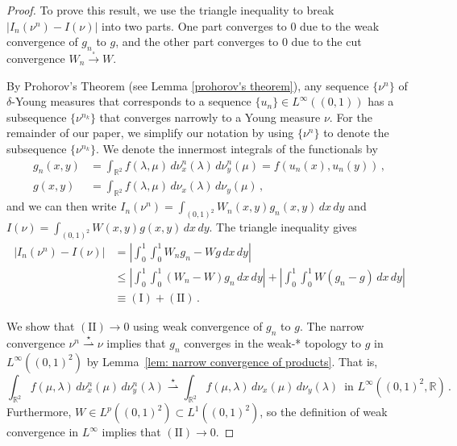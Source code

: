 \documentclass[11pt]{amsart}
\def\R{\mathbb{R}}
\def\ra{\rightarrow}
\def\sqra{\stackrel{\square}{\longrightarrow}}
\def\weakstarra{\stackrel{\star}{\rightharpoonup}}
\numberwithin{equation}{section}
\begin{document}
{{\begin{proof}
To prove this result, we use the triangle inequality to break $|I_n(\nu^n) - I(\nu)|$ into two parts. {One part} converges to $0$ due to {the} weak convergence of $g_n$ to $g$, and the other part converges to $0$ due to the cut convergence $W_n \sqra W$.

By {Prohorov's Theorem ({see} Lemma \ref{prohorov's theorem})}, any sequence $\{\nu^n\}$ of $\delta$-Young measures that corresponds to a sequence $\{u_n\} \in L^\infty((0,1))$ has a subsequence $\{\nu^{n_k}\}$ that converges narrowly to a Young measure $\nu$. For the remainder of our paper, we simplify our notation by using $\{\nu^n\}$ to denote the subsequence $\{\nu^{n_k}\}$.
We denote the innermost integrals of the functionals by 
\begin{align*}
    g_n(x,y) &= \int_{\R^2} f(\lambda,\mu) \,d\nu^n_x (\lambda) \,d\nu^n_y(\mu) = f(u_n(x),u_n(y)) \,, \\
    g(x,y) &= \int_{\R^2} f(\lambda,\mu) \,d\nu_x (\lambda) \,d\nu_y(\mu) \,,
\end{align*}
and we can then write $I_n(\nu^n) = \int_{(0,1)^2}W_n(x,y) g_n(x,y) \,dx \, dy$ and $I(\nu) = \int_{(0,1)^2} W(x,y) g(x,y) \, dx \, dy$. 
The triangle inequality gives
\begin{align*}
    |I_n(\nu^n) - I(\nu)| &= \left|\int_0^1\int_0^1 W_ng_n - Wg \,dx\,dy\right| \\
	    &\leq \left| \int_0^1\int_0^1 (W_n - W)g_n \,dx\,dy\right| + \left| \int_0^1\int_0^1 W(g_n - g)  \,dx\,dy\right| \\
	    &\equiv ({\mathrm{I}}) + ({\mathrm{II}}) \,. 
\end{align*}	



We show that {${(\mathrm{II})} \ra 0$} using weak convergence of $g_n$ to $g$. The narrow convergence $\nu^n \weakstarra \nu$ implies that {$g_n$ converges in the weak-* topology to $g$} in $L^{\infty}((0,1)^2)$ by {Lemma}~\ref{lem: narrow convergence of products}. That is,
\begin{equation*}
    \int_{\mathbb{R}^2} f(\mu,\lambda) \, d \nu_x^n(\mu) \, d \nu_y^n(\lambda) \weakstarra \int_{\mathbb{R}^2} f(\mu,\lambda) \, d \nu_x(\mu) \, d \nu_y(\lambda) \, \text{ in }  L^{\infty}((0,1)^2,\mathbb{R})\,. 
\end{equation*} 
Furthermore, $W \in L^p((0,1)^2) \subset L^1((0,1)^2)$, so the definition of weak convergence in $L^\infty$ implies that $(\mathrm{II}) \ra 0$.


\end{proof}}}
\end{document}
